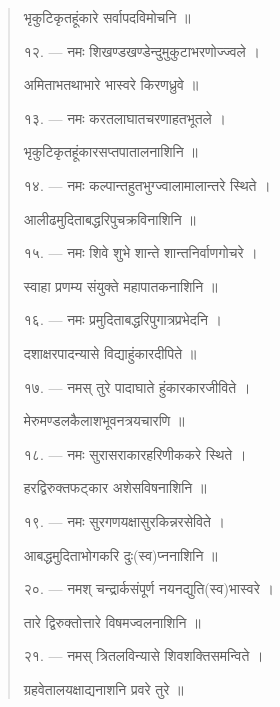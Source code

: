 \documentclass[a4paper, 11pt, oneside, french]{article}
\begin{document}
\begin{quotation}
\texthindi{भृकुटिकृतहूंकारे सर्वापदविमोचनि ॥}

\bigskip

\texthindi{१२}. --- \texthindi{नमः शिखण्डखण्डेन्दुमुकुटाभरणोज्ज्वले ।}

\texthindi{अमिताभतथाभारे भास्वरे किरणध्रुवे ॥}

\bigskip

\texthindi{१३}. --- \texthindi{नमः करतलाघातचरणाहतभूतले ।}

\texthindi{भृकुटिकृतहूंकारसप्तपातालनाशिनि ॥}

\bigskip

\texthindi{१४}. --- \texthindi{नमः कल्पान्तहुतभुग्ज्वालामालान्तरे स्थिते ।}

\texthindi{आलीढमुदिताबद्धरिपुचक्रविनाशिनि ॥}

\bigskip

\texthindi{१५}. --- \texthindi{नमः शिवे शुभे शान्ते शान्तनिर्वाणगोचरे ।}

\texthindi{स्वाहा प्रणम्य संयुक्ते महापातकनाशिनि ॥}

\bigskip

\texthindi{१६}. --- \texthindi{नमः प्रमुदिताबद्धरिपुगात्रप्रभेदनि ।}

\texthindi{दशाक्षरपादन्यासे विद्याहुंकारदीपिते ॥}

\bigskip

\texthindi{१७}. --- \texthindi{नमस् तुरे पादाघाते हुंकारकारजीविते ।}

\texthindi{मेरुमण्डलकैलाशभूवनत्रयचारणि ॥}

\bigskip

\texthindi{१८}. --- \texthindi{नमः सुरासराकारहरिणीककरे स्थिते ।}

\texthindi{हरद्विरुक्तफट्कार अशेसविषनाशिनि ॥}

\bigskip

\texthindi{१९}. --- \texthindi{नमः सुरगणयक्षासुरकिन्नरसेविते ।}

\texthindi{आबद्धमुदिताभोगकरि दुः(स्व)प्ननाशिनि ॥}

\bigskip

\texthindi{२०}. --- \texthindi{नमश् चन्द्रार्कसंपूर्ण नयनद्युति(स्व)भास्वरे ।}

\texthindi{तारे द्विरुक्तोत्तारे विषमज्वलनाशिनि ॥}

\bigskip

\texthindi{२१}. --- \texthindi{नमस् त्रितलविन्यासे शिवशक्तिसमन्विते ।}

\texthindi{ग्रहवेतालयक्षाद्यनाशनि प्रवरे तुरे ॥}

\bigskip


\end{quotation}
\end{document}
